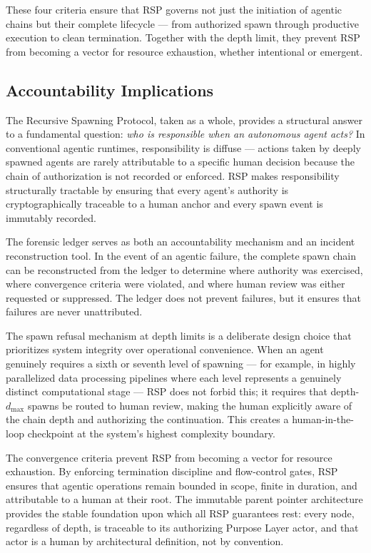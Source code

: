 These four criteria ensure that RSP governs not just the initiation of agentic chains but their complete lifecycle — from authorized spawn through productive execution to clean termination. Together with the depth limit, they prevent RSP from becoming a vector for resource exhaustion, whether intentional or emergent.

\subsection{Accountability Implications}
\label{sec:accountability-implications}

The Recursive Spawning Protocol, taken as a whole, provides a structural answer to a fundamental question: \textit{who is responsible when an autonomous agent acts?} In conventional agentic runtimes, responsibility is diffuse — actions taken by deeply spawned agents are rarely attributable to a specific human decision because the chain of authorization is not recorded or enforced. RSP makes responsibility structurally tractable by ensuring that every agent's authority is cryptographically traceable to a human anchor and every spawn event is immutably recorded.

The forensic ledger serves as both an accountability mechanism and an incident reconstruction tool. In the event of an agentic failure, the complete spawn chain can be reconstructed from the ledger to determine where authority was exercised, where convergence criteria were violated, and where human review was either requested or suppressed. The ledger does not prevent failures, but it ensures that failures are never unattributed.

The spawn refusal mechanism at depth limits is a deliberate design choice that prioritizes system integrity over operational convenience. When an agent genuinely requires a sixth or seventh level of spawning — for example, in highly parallelized data processing pipelines where each level represents a genuinely distinct computational stage — RSP does not forbid this; it requires that depth-$d_{\max}$ spawns be routed to human review, making the human explicitly aware of the chain depth and authorizing the continuation. This creates a human-in-the-loop checkpoint at the system's highest complexity boundary.

The convergence criteria prevent RSP from becoming a vector for resource exhaustion. By enforcing termination discipline and flow-control gates, RSP ensures that agentic operations remain bounded in scope, finite in duration, and attributable to a human at their root. The immutable parent pointer architecture provides the stable foundation upon which all RSP guarantees rest: every node, regardless of depth, is traceable to its authorizing Purpose Layer actor, and that actor is a human by architectural definition, not by convention.